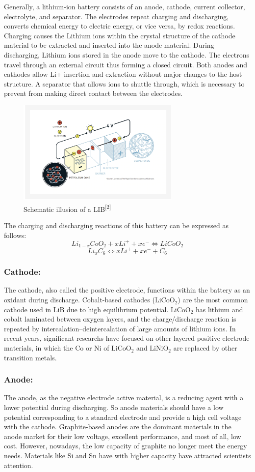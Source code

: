 Generally, a lithium-ion battery consists of an anode, cathode, current collector, electrolyte, and separator. The electrodes repeat charging and discharging, converts chemical energy to electric energy, or vice versa, by redox reactions. Charging causes the Lithium ions within the crystal structure of the cathode material to be extracted and inserted into the anode material. During discharging, Lithium ions stored in the anode move to the cathode. The electrons travel through an external circuit thus forming a closed circuit. Both anodes and cathodes allow Li+ insertion and extraction without major changes to the host structure. A separator that allows ions to shuttle through, which is necessary to prevent from making direct contact between the electrodes.
\begin{figure}[h]
\centering
\includegraphics[width=8cm]{src/fig/fig2.png}
\caption{Schematic illusion of a LIB\textsuperscript{[2]}}
\end{figure}
The charging and discharging reactions of this battery can be expressed as follows:
$$L i_{1-x} C o O_{2}+x L i^{+}+x e^{-} \Leftrightarrow L i C o O_{2}$$
$$L i_{x} C_{6} \Leftrightarrow x L i^{+}+x e^{-}+C_{6}$$
\subsubsection{Cathode:}
The cathode, also called the positive electrode, functions within the battery as an oxidant during discharge. Cobalt-based cathodes ($\mathrm{LiCoO_{2}}$) are the most common cathode used in LiB due to high equilibrium potential. $\mathrm{LiCoO_{2}}$ has lithium and cobalt laminated between oxygen layers, and the charge/discharge reaction is repeated by intercalation–deintercalation of large amounts of lithium ions. In recent years, significant researchs have focused on other layered positive electrode materials, in which the Co or Ni of $\mathrm{LiCoO_{2}}$ and $\mathrm{LiNiO_{2}}$ are replaced by other transition metals. 
\subsubsection{Anode:}
The anode, as the negative electrode active material, is a reducing agent with a lower potential during discharging. So anode materials should have a low potential corresponding to a standard electrode and provide a high cell voltage with the cathode. Graphite-based anodes are the dominant materials in the anode market for their low voltage, excellent performance, and most of all, low cost. However, nowadays, the low capacity of graphite no longer meet the energy needs. Materials like Si and Sn have with higher capacity have attracted scientists attention.
